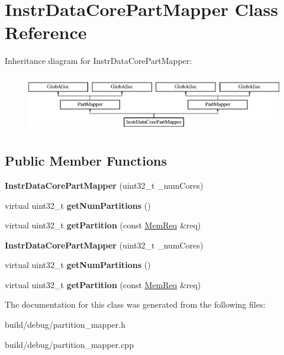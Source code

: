 \hypertarget{classInstrDataCorePartMapper}{\section{Instr\-Data\-Core\-Part\-Mapper Class Reference}
\label{classInstrDataCorePartMapper}
}
Inheritance diagram for Instr\-Data\-Core\-Part\-Mapper\-:\begin{figure}[H]
\begin{center}
\leavevmode
\includegraphics[height=2.545455cm]{classInstrDataCorePartMapper}
\end{center}
\end{figure}
\subsection*{Public Member Functions}
\begin{DoxyCompactItemize}
\item 
\hypertarget{classInstrDataCorePartMapper_a447aa17c7bcfe4ad3955064a51184f11}{{\bfseries Instr\-Data\-Core\-Part\-Mapper} (uint32\-\_\-t \-\_\-num\-Cores)}\label{classInstrDataCorePartMapper_a447aa17c7bcfe4ad3955064a51184f11}

\item 
\hypertarget{classInstrDataCorePartMapper_a1008e1e594fac3edd532babd89b8a4ba}{virtual uint32\-\_\-t {\bfseries get\-Num\-Partitions} ()}\label{classInstrDataCorePartMapper_a1008e1e594fac3edd532babd89b8a4ba}

\item 
\hypertarget{classInstrDataCorePartMapper_ad4610e28ad9d45a77e79bca8d8c434ed}{virtual uint32\-\_\-t {\bfseries get\-Partition} (const \hyperlink{structMemReq}{Mem\-Req} \&req)}\label{classInstrDataCorePartMapper_ad4610e28ad9d45a77e79bca8d8c434ed}

\item 
\hypertarget{classInstrDataCorePartMapper_a447aa17c7bcfe4ad3955064a51184f11}{{\bfseries Instr\-Data\-Core\-Part\-Mapper} (uint32\-\_\-t \-\_\-num\-Cores)}\label{classInstrDataCorePartMapper_a447aa17c7bcfe4ad3955064a51184f11}

\item 
\hypertarget{classInstrDataCorePartMapper_a1008e1e594fac3edd532babd89b8a4ba}{virtual uint32\-\_\-t {\bfseries get\-Num\-Partitions} ()}\label{classInstrDataCorePartMapper_a1008e1e594fac3edd532babd89b8a4ba}

\item 
\hypertarget{classInstrDataCorePartMapper_a9a1e3c89c90a19fffe5593f5503fde62}{virtual uint32\-\_\-t {\bfseries get\-Partition} (const \hyperlink{structMemReq}{Mem\-Req} \&req)}\label{classInstrDataCorePartMapper_a9a1e3c89c90a19fffe5593f5503fde62}

\end{DoxyCompactItemize}


The documentation for this class was generated from the following files\-:\begin{DoxyCompactItemize}
\item 
build/debug/partition\-\_\-mapper.\-h\item 
build/debug/partition\-\_\-mapper.\-cpp\end{DoxyCompactItemize}

